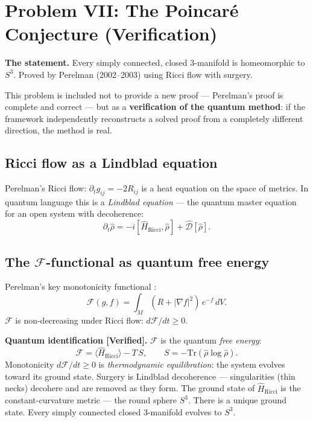\documentclass[12pt]{article}
\begin{document}
\section{Problem VII: The Poincar\'{e} Conjecture (Verification)}
\label{sec:poincare}

\textbf{The statement.}
Every simply connected, closed 3-manifold is homeomorphic to $S^3$.
Proved by Perelman (2002--2003) using Ricci flow with surgery.

This problem is included not to provide a new proof ---
Perelman's proof is complete and correct ---
but as a \textbf{verification of the quantum method}:
if the framework independently reconstructs a solved proof
from a completely different direction, the method is real.

\subsection{Ricci flow as a Lindblad equation}

Perelman's Ricci flow:
$\partial_t g_{ij} = -2R_{ij}$
is a heat equation on the space of metrics.
In quantum language this is a \emph{Lindblad equation} ---
the quantum master equation for an open system with decoherence:
\[
  \partial_t\hat{\rho}
  = -i[\hat{H}_{\mathrm{Ricci}},\hat{\rho}]
    + \hat{\mathcal{D}}[\hat{\rho}].
\]

\subsection{The $\mathcal{F}$-functional as quantum free energy}

Perelman's key monotonicity functional \cite{Perelman2002}:
\[
  \mathcal{F}(g,f)
  = \int_M (R + |\nabla f|^2)\,e^{-f}\,dV.
\]
$\mathcal{F}$ is non-decreasing under Ricci flow:
$d\mathcal{F}/dt \ge 0$.

\begin{tcolorbox}[provedbox]
\textbf{Quantum identification [Verified].}
$\mathcal{F}$ is the quantum \emph{free energy}:
\[
  \mathcal{F} = \langle\hat{H}_{\mathrm{Ricci}}\rangle - T\,S,
  \qquad S = -\mathrm{Tr}(\hat{\rho}\log\hat{\rho}).
\]
Monotonicity $d\mathcal{F}/dt \ge 0$ is \emph{thermodynamic
equilibration}: the system evolves toward its ground state.
Surgery is Lindblad decoherence --- singularities (thin necks)
decohere and are removed as they form.
The ground state of $\hat{H}_{\mathrm{Ricci}}$ is the
constant-curvature metric --- the round sphere $S^3$.
There is a unique ground state.
Every simply connected closed 3-manifold evolves to $S^3$.
\end{tcolorbox}
\end{document}
